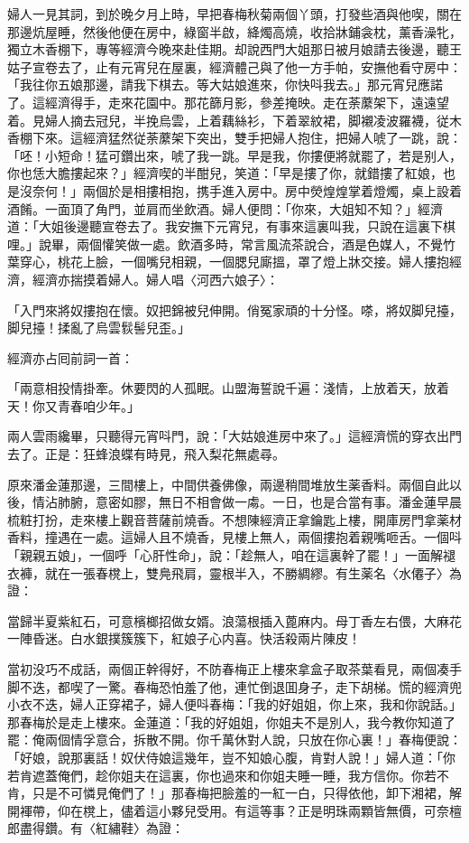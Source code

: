 婦人一見其詞，到於晚夕月上時，早把春梅秋菊兩個丫頭，打發些酒與他喫，關在那邊炕屋睡，然後他便在房中，綠窗半啟，絳燭高燒，收拾牀鋪衾枕，薰香澡牝，獨立木香棚下，專等經濟今晚來赴佳期。却說西門大姐那日被月娘請去後邊，聽王姑子宣卷去了，止有元宵兒在屋裏，經濟體己與了他一方手帕，安撫他看守房中：「我往你五娘那邊，請我下棋去。等大姑娘進來，你快呌我去。」那元宵兒應諾了。這經濟得手，走來花園中。那花篩月影，參差掩映。走在荼䕷架下，遠遠望着。見婦人摘去冠兒，半挽烏雲，上着藕絲衫，下着翠紋裙，脚襯凌波羅襪，従木香棚下來。這經濟猛然従荼䕷架下突出，雙手把婦人抱住，把婦人唬了一跳，說：「呸！小短命！猛可鑽出來，唬了我一跳。早是我，你摟便將就罷了，若是别人，你也恁大膽摟起來？」經濟喫的半酣兒，笑道：「早是摟了你，就錯摟了紅娘，也是沒奈何！」兩個於是相摟相抱，携手進入房中。房中熒煌煌掌着燈燭，桌上設着酒餚。一面頂了角門，並肩而坐飲酒。婦人便問：「你來，大姐知不知？」經濟道：「大姐後邊聽宣卷去了。我安撫下元宵兒，有事來這裏叫我，只說在這裏下棋哩。」說畢，兩個懽笑做一處。飲酒多時，常言風流茶說合，酒是色媒人，不覺竹葉穿心，桃花上臉，一個嘴兒相親，一個腮兒廝搵，罩了燈上牀交接。婦人摟抱經濟，經濟亦揣摸着婦人。婦人唱〈河西六娘子〉：

「入門來將奴摟抱在懷。奴把錦被兒伸開。俏冤家頑的十分怪。嗏，將奴脚兒擡，脚兒擡！揉亂了烏雲䯼髻兒歪。」

經濟亦占囘前詞一首：

「兩意相投情掛牽。休要閃的人孤眠。山盟海誓說千遍：淺情，上放着天，放着天！你又青春咱少年。」

兩人雲雨纔畢，只聽得元宵呌門，說：「大姑娘進房中來了。」這經濟慌的穿衣出門去了。正是：狂蜂浪蝶有時見，飛入梨花無處尋。

原來潘金蓮那邊，三間樓上，中間供養佛像，兩邊稍間堆放生薬香料。兩個自此以後，情沾肺腑，意密如膠，無日不相會做一䖏。一日，也是合當有事。潘金蓮早晨梳粧打扮，走來樓上觀音菩薩前燒香。不想陳經濟正拿鑰匙上樓，開庫房門拿薬材香料，撞遇在一處。這婦人且不燒香，見樓上無人，兩個摟抱着親嘴咂舌。一個呌「親親五娘」，一個呼「心肝性命」，說：「趁無人，咱在這裏幹了罷！」一面解褪衣褲，就在一張春櫈上，雙鳧飛肩，靈根半入，不勝綢繆。有生薬名〈水僊子〉為證：

當歸半夏紫紅石，可意檳榔招做女婿。浪蕩根插入蓖麻内。母丁香左右偎，大麻花一陣昏迷。白水銀撲簇簇下，紅娘子心内喜。快活殺兩片陳皮！

當初没巧不成話，兩個正幹得好，不防春梅正上樓來拿盒子取茶葉看見，兩個凑手脚不迭，都喫了一驚。春梅恐怕羞了他，連忙倒退囬身子，走下胡梯。慌的經濟兜小衣不迭，婦人正穿裙子，婦人便呌春梅：「我的好姐姐，你上來，我和你說話。」那春梅於是走上樓來。金蓮道：「我的好姐姐，你姐夫不是別人，我今教你知道了罷：俺兩個情孚意合，拆散不開。你千萬休對人說，只放在你心裏！」春梅便說：「好娘，說那裏話！奴伏侍娘這幾年，豈不知娘心腹，肯對人說！」婦人道：「你若肯遮蓋俺們，趁你姐夫在這裏，你也過來和你姐夫睡一睡，我方信你。你若不肯，只是不可憐見俺們了！」那春梅把臉羞的一紅一白，只得依他，卸下湘裙，解開褌帶，仰在櫈上，儘着這小夥兒受用。有這等事？正是明珠兩顆皆無價，可奈檀郎盡得鑽。有〈紅繡鞋〉為證：

